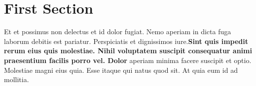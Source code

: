 \documentclass{article}
\begin{document}
\section{First Section}
Et et possimus non delectus et id dolor fugiat. Nemo aperiam in
dicta fuga laborum debitis est pariatur.  Perspiciatis et
dignissimos iure.{\bf Sint quis impedit rerum eius quis molestiae.
Nihil voluptatem suscipit consequatur animi praesentium facilis
porro vel. Dolor} aperiam minima facere suscipit et optio.
Molestiae magni eius quia. Esse itaque qui natus quod sit. At
quia eum id ad mollitia.
\end{document}
